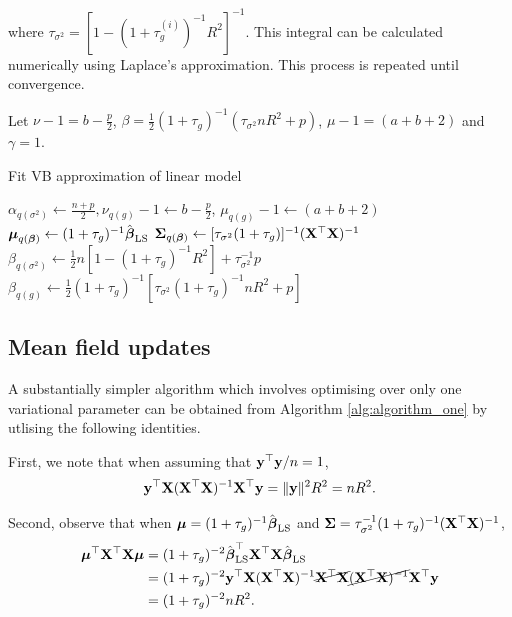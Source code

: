 \documentclass{amsart}[12pt]
\begin{document}
\noindent where $\tau_{\sigma^2} = [1 - (1 + \tau_g^{(i)})^{-1} R^2]^{-1}$. This integral can be calculated
numerically using Laplace's approximation. This process is repeated until convergence.

Let $\nu - 1 = b - \frac{p}{2}$, 
$\beta = \frac{1}{2} (1 + \tau_g)^{-1} (\tau_{\sigma^2} n R^2 + p)$, 
$\mu - 1 = (a + b + 2)$ and $\gamma = 1$. 

\begin{algorithm}
	\caption{Fit VB approximation of linear model}
	\label{alg:algorithm_one}
	\begin{algorithmic}
		\REQUIRE $\alpha_{q(\sigma^2)} \leftarrow \frac{n + p}{2}, \nu_{q(g)} - 1 \leftarrow b - \frac{p}{2}$, $\mu_{q(g)} - 1 \leftarrow (a + b + 2)$
		\STATE ${\boldsymbol \mu}_{q({\boldsymbol \beta})} \leftarrow (1 + \tau_g)^{-1} \hat{{\boldsymbol \beta}}_{\text{LS}}$
		\STATE ${\boldsymbol \Sigma}_{q({\boldsymbol \beta})} \leftarrow [\tau_{\sigma^2} (1 + \tau_g)]^{-1} ({\bf X}^\top {\bf X})^{-1}$
		\STATE $\beta_{q(\sigma^2)} \leftarrow  \frac{1}{2} {n[1 - (1 + \tau_g)^{-1} R^2] + \tau_{\sigma^2}^{-1} p}$
		\STATE $\beta_{q(g)} \leftarrow \frac{1}{2} (1 + \tau_g)^{-1} [\tau_{\sigma^2} (1 + \tau_g)^{-1} n R^2 + p]$
		\ENDWHILE
	\end{algorithmic}
\end{algorithm}

\subsection{Mean field updates}
\label{sec:mean_field_updates}

A substantially simpler algorithm  which involves optimising over only one variational parameter can be
obtained from Algorithm \ref{alg:algorithm_one} by utlising the following identities.

First, we note that when assuming that ${\bf y}^\top {\bf y} / n = 1$,
\[{\bf y}^\top {\bf X} ({\bf X}^\top {\bf X})^{-1} {\bf X}^\top {\bf y} =\|{\bf y}\|^2 R^2 = n R^2.\]

Second, observe that when ${\boldsymbol \mu} = (1 + \tau_g)^{-1} \hat{{\boldsymbol \beta}}_{\text{LS}}$ and ${\boldsymbol \Sigma} = \tau_{\sigma^2}^{-1} (1 + \tau_g)^{-1} ({\bf X}^\top {\bf X})^{-1}$,
\begin{align*}
	{\boldsymbol\mu}^\top {\bf X}^\top {\bf X} {\boldsymbol\mu} & = (1 + \tau_g)^{-2} \hat{{\boldsymbol \beta}}_{\text{LS}}^\top {\bf X}^\top {\bf X} \hat{{\boldsymbol \beta}}_{\text{LS}}                                                        \\
	                            & = (1 + \tau_g)^{-2} {\bf y}^\top {\bf X} ({\bf X}^\top {\bf X})^{-1} \cancel{{\bf X}^\top {\bf X}} \cancel{({\bf X}^\top {\bf X})^{-1}} {\bf X}^\top {\bf y} \\
	                            & = (1 + \tau_g)^{-2} n R^2.                                                                                           
\end{align*}
\end{document}
